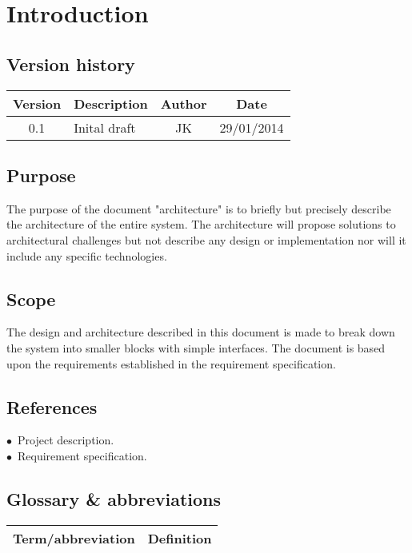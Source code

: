 \chapter{Introduction}
\section{Version history}
\begin{table}[H]
\begin{tabular}{|c|p{9cm}|c|c|}
\hline
Version & Description & Author & Date\\
\hline
0.1 & Inital draft & JK & 29/01/2014\\
\hline
\end{tabular}
\end{table}

\section{Purpose}
The purpose of the document "architecture" is to briefly but precisely describe the architecture of the entire system. The architecture will propose solutions to architectural challenges but not describe any design or implementation nor will it include any specific technologies.

\section{Scope}
The design and architecture described in this document is made to break down the system into smaller blocks with simple interfaces. The document is based upon the requirements established in the requirement specification.

\section{References}
$\bullet$\ Project description.\\
$\bullet$\ Requirement specification.\\



\section{Glossary \& abbreviations}
\begin{table}[H]
\centering
\begin{tabular}{|p{4cm}|p{7cm}|}
\hline
Term/abbreviation & Definition\\ \hline
\end{tabular}
\end{table}
